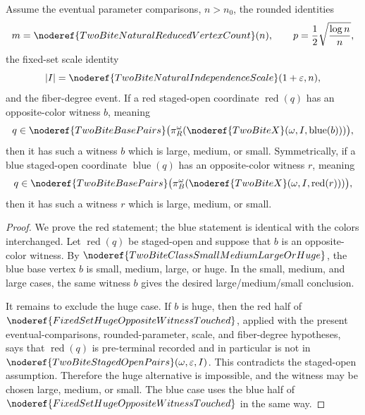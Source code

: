\begin{lemma}
Assume the eventual parameter comparisons, \(n>n_0\), the rounded identities
\[
m=\noderef{TwoBiteNaturalReducedVertexCount}(n),\qquad
p=\frac12\sqrt{\frac{\log n}{n}},
\]
the fixed-set scale identity
\[
|I|=\noderef{TwoBiteNaturalIndependenceScale}(1+\varepsilon,n),
\]
and the fiber-degree event.  If a red staged-open coordinate
\(\operatorname{red}(q)\) has an opposite-color witness \(b\), meaning
\[
q\in\noderef{TwoBiteBasePairs}
\bigl(\pi_R^\omega(\noderef{TwoBiteX}(\omega,I,\operatorname{blue}(b)))\bigr),
\]
then it has such a witness \(b\) which is large, medium, or small.  Symmetrically,
if a blue staged-open coordinate \(\operatorname{blue}(q)\) has an
opposite-color witness \(r\), meaning
\[
q\in\noderef{TwoBiteBasePairs}
\bigl(\pi_B^\omega(\noderef{TwoBiteX}(\omega,I,\operatorname{red}(r)))\bigr),
\]
then it has such a witness \(r\) which is large, medium, or small.
\end{lemma}
\begin{proof}
We prove the red statement; the blue statement is identical with the colors
interchanged.  Let \(\operatorname{red}(q)\) be staged-open and suppose that
\(b\) is an opposite-color witness.  By
\(\noderef{TwoBiteClassSmallMediumLargeOrHuge}\), the blue base vertex \(b\)
is small, medium, large, or huge.  In the small, medium, and large cases, the
same witness \(b\) gives the desired large/medium/small conclusion.

It remains to exclude the huge case.  If \(b\) is huge, then the red half of
\(\noderef{FixedSetHugeOppositeWitnessTouched}\), applied with the present
eventual-comparisons, rounded-parameter, scale, and fiber-degree hypotheses,
says that \(\operatorname{red}(q)\) is pre-terminal recorded and in particular
is not in \(\noderef{TwoBiteStagedOpenPairs}(\omega,\varepsilon,I)\).  This
contradicts the staged-open assumption.  Therefore the huge alternative is
impossible, and the witness may be chosen large, medium, or small.  The blue
case uses the blue half of
\(\noderef{FixedSetHugeOppositeWitnessTouched}\) in the same way.
\end{proof}
